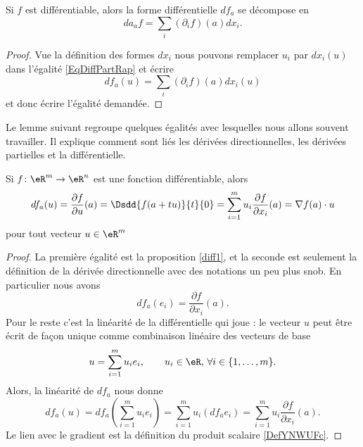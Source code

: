 \begin{corollary}       \label{CORooXURPooQMKvBl}
    Si \( f\) est différentiable, alors la forme différentielle \( df_a\) se décompose en
    \begin{equation}
        da_af=\sum_i(\partial_if)(a)dx_i.
    \end{equation}
\end{corollary}

\begin{proof}
    Vue la définition des formes \( dx_i\) nous pouvons remplacer \( u_i\) par \( dx_i(u)\) dans l'égalité \eqref{EqDiffPartRap} et écrire
    \begin{equation}
        df_a(u)=\sum_i(\partial_if)(a)dx_i(u)
    \end{equation}
    et donc écrire l'égalité demandée.
\end{proof}

Le lemme suivant regroupe quelques égalités avec lesquelles nous allons souvent travailler. Il explique comment sont liés les dérivées directionnelles, les dérivées partielles et la différentielle.
\begin{lemma}		\label{LemdfaSurLesPartielles}
	Si $f\colon \eR^m\to \eR^n$ est une fonction différentiable, alors
	\begin{equation}
        df_a(u)=\frac{ \partial f }{ \partial u }(a)=\Dsdd{ f(a+tu) }{t}{0}=\sum_{i=1}^mu_i\frac{ \partial f }{ \partial x_i }(a)=\nabla f(a)\cdot u
	\end{equation}
	pour tout vecteur $u\in\eR^m$
\end{lemma}

\begin{proof}
La première égalité est la proposition \ref{diff1}, et la seconde est seulement la définition de la dérivée directionnelle avec des notations un peu plus snob. En particulier nous avons
\begin{equation}
    df_a(e_i)=\frac{ \partial f }{ \partial x_i }(a).
\end{equation}
Pour le reste c'est la linéarité de la différentielle qui joue : le vecteur $u$ peut être écrit de façon unique comme combinaison linéaire des vecteurs de base 
\[
u=\sum_{i=1}^{m}u_i e_i, \qquad  u_i\in\eR,\, \forall i\in\{1,\ldots, m\}.
\]
Alors, la linéarité de $df_a$ nous donne
\begin{equation}
     df_a(u)= df_a\left(\sum_{i=1}^{m}u_i e_i\right)
=\sum_{i=1}^{m}u_i \left(df_ae_i\right)
=\sum_{i=1}^{m}u_i \frac{ \partial f }{ \partial x_i }(a).
 \end{equation}
Le lien avec le gradient est la définition du produit scalaire \eqref{DefYNWUFc}.
\end{proof}



